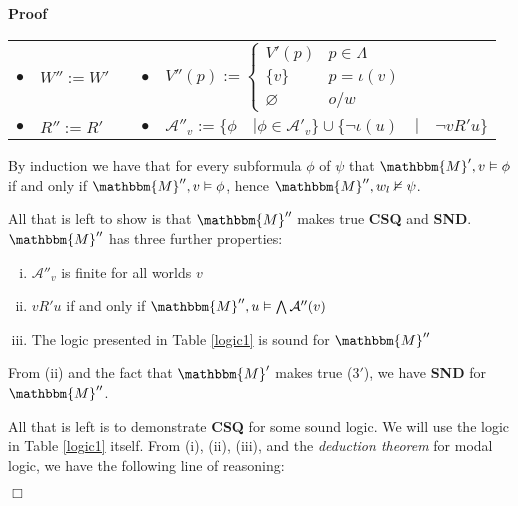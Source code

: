 \documentclass{article}
\newcommand{\assign}{:=}
\newcommand{\tmtextbf}[1]{{\bfseries{#1}}}
\newcommand{\tmtextit}[1]{{\itshape{#1}}}
\newenvironment{enumerateroman}{\begin{enumerate}[i.] }{\end{enumerate}}
\newenvironment{proof}{\noindent\textbf{Proof\ }}{\hspace*{\fill}$\Box$\medskip}
\begin{document}
\begin{proof}
  
  
  \begin{center}
    \begin{tabular}{lllll}
      $\bullet$ & $W'' \assign W'$ &  & $\bullet$ & $V'' (p) \assign \left\{
      \begin{array}{ll}
        V' (p) & p \in \Lambda\\
        \{v\} & p = \iota (v)\\
        \varnothing & o / w
      \end{array} \right.$\\
      $\bullet$ & $R'' \assign R'$ & {\hspace{3em}} & $\bullet$ &
      $\mathcal{A}''_v \assign \{\phi \hspace{1em} | \phi \in \mathcal{A}'_v
      \} \cup \{\neg \iota (u) \hspace{1em} | \hspace{1em} \neg v R' u\}$
    \end{tabular}
  \end{center}
  
  
  
  By induction we have that for every subformula $\phi$ of $\psi$ that
  $\mathbbm{M}', v \vDash \phi$ if and only if $\mathbbm{M}'', v \vDash \phi$,
  hence $\mathbbm{M}'', w_l \nvDash \psi$.
  
  
  
  All that is left to show is that $\mathbbm{M}''$ makes true \tmtextbf{CSQ}
  and \tmtextbf{SND}.  $\mathbbm{M}''$ has three further properties:
  \begin{enumerateroman}
    \item $\mathcal{A}''_v$ is finite for all worlds $v$
    
    \item  $v R' u$ if and only if $\mathbbm{M}'', u \vDash \bigwedge
    \mathcal{A}'' (v)$
    
    \item The logic presented in Table \ref{logic1} is sound for
    $\mathbbm{M}''$
  \end{enumerateroman}
  From (ii) and the fact that $\mathbbm{M}'$ makes true (3$'$), we have
  \tmtextbf{SND} for $\mathbbm{M}''$.
  
  
  
  All that is left is to demonstrate \tmtextbf{CSQ} for some sound logic.  We
  will use the logic in Table \ref{logic1} itself.  From (i), (ii), (iii),
  and the \tmtextit{deduction theorem} for modal logic, we have the following
  line of reasoning:
  

\end{proof}
\end{document}
